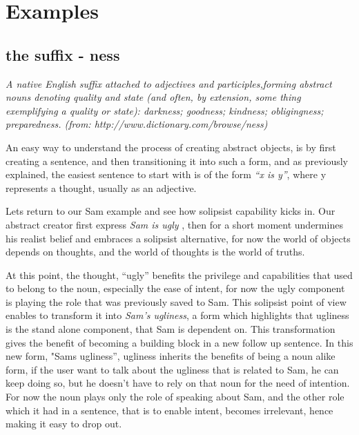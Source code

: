 \documentclass[10pt]{article}
\begin{document}
\newpage 
\section*{Examples}
\subsection*{the suffix - ness}
\textit{A native English suffix attached to adjectives and participles,forming abstract nouns denoting quality and state (and often, by extension, some thing exemplifying a quality or state):
darkness; goodness; kindness; obligingness; preparedness.
(from: http://www.dictionary.com/browse/ness)}
\par
An easy way to understand the process of creating abstract objects, is by first creating a sentence, and then transitioning it into such a form, and as previously explained, the easiest sentence to start with is of the form \textit{“x is y”}, where y represents a thought, usually as an adjective.\par
Lets return to our Sam example and see how solipsist capability kicks in. Our abstract creator first express \textit{Sam is ugly} , then for a short moment undermines his realist belief and embraces a solipsist alternative, for now the world of objects depends on thoughts, and the world of thoughts is the world of truths.\par

At this point, the thought, “ugly”  benefits the privilege and capabilities that used to belong to the noun, especially the ease of intent, for now the ugly component is playing the role that was previously saved to Sam. This solipsist point of view enables to transform it into \textit{Sam's ugliness}, a form which highlights that ugliness is the stand alone component, that Sam is dependent on. This transformation gives the benefit of becoming a building block in a new  follow up sentence. In this new form, "Sams ugliness”, ugliness inherits the benefits of being a noun alike form, if the user want to talk about the ugliness that is related to Sam, he can keep doing so, but he doesn't have to rely on that noun for the need of intention. For now the noun plays only the role of speaking about Sam, and the other role which it had in a sentence, that is to enable intent, becomes irrelevant, hence making it easy to drop out.\par
\end{document}
